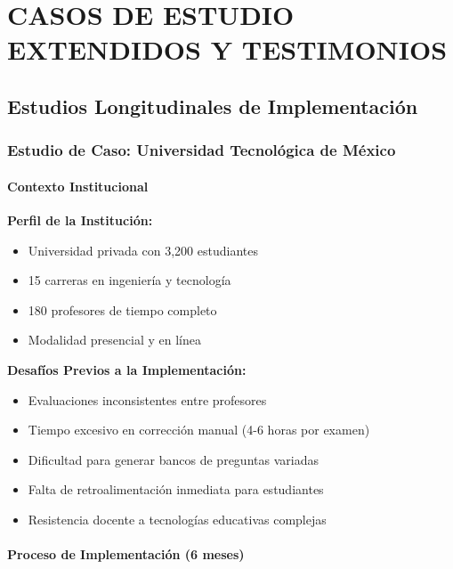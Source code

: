 \documentclass[12pt,a4paper]{report}
\begin{document}
\chapter{CASOS DE ESTUDIO EXTENDIDOS Y TESTIMONIOS}

\section{Estudios Longitudinales de Implementación}

\subsection{Estudio de Caso: Universidad Tecnológica de México}

\subsubsection{Contexto Institucional}

\textbf{Perfil de la Institución:}
\begin{itemize}
\item Universidad privada con 3,200 estudiantes
\item 15 carreras en ingeniería y tecnología
\item 180 profesores de tiempo completo
\item Modalidad presencial y en línea
\end{itemize}

\textbf{Desafíos Previos a la Implementación:}
\begin{itemize}
\item Evaluaciones inconsistentes entre profesores
\item Tiempo excesivo en corrección manual (4-6 horas por examen)
\item Dificultad para generar bancos de preguntas variadas
\item Falta de retroalimentación inmediata para estudiantes
\item Resistencia docente a tecnologías educativas complejas
\end{itemize}

\subsubsection{Proceso de Implementación (6 meses)}
\end{document}
